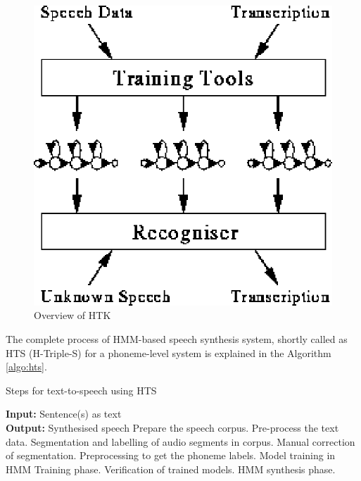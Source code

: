 \documentclass{article}
\begin{document}
\begin{figure}[h]
\centering
\includegraphics[scale=0.45]{figures/htk_overview.eps}
\caption{Overview of HTK}
\label{fig:htkOverview}
\end{figure}



The complete process of HMM-based speech synthesis system, shortly called as HTS 
(H-Triple-S) for a phoneme-level system is explained in the Algorithm \ref{algo:hts}.

\begin{algorithm}[!th]
\caption{Steps for text-to-speech using HTS }
\label{algo:hts}
\begin{algorithmic}[1]

\STATE  \textbf{Input:} Sentence(s) as text \\
\textbf{Output:} Synthesised speech
\STATE Prepare the speech corpus.
\STATE Pre-process the text data.
\STATE Segmentation and labelling of audio segments in corpus.
\STATE Manual correction of segmentation.
\STATE Preprocessing to get the phoneme labels.
\STATE Model training in HMM Training phase.
\STATE Verification of trained models.
\STATE HMM synthesis phase.
\end{algorithmic}
\end{algorithm}
\end{document}
